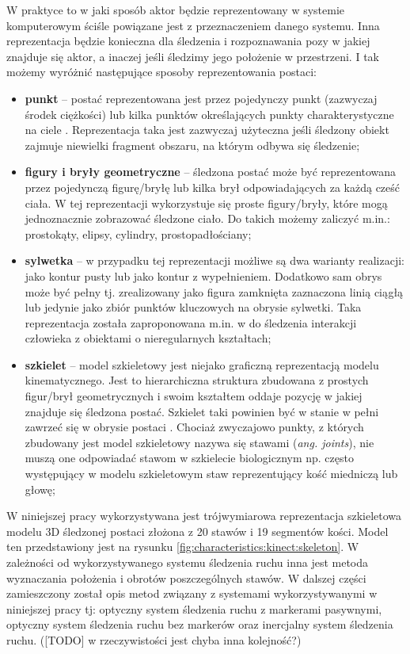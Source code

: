 	W praktyce to w jaki sposób aktor będzie reprezentowany w systemie komputerowym ściśle powiązane jest z przeznaczeniem danego systemu. Inna reprezentacja będzie konieczna dla śledzenia i rozpoznawania pozy w jakiej znajduje się aktor, a inaczej jeśli śledzimy jego położenie w przestrzeni. I tak możemy wyróżnić następujące sposoby reprezentowania postaci:
	\begin{itemize}
		\item \textbf{punkt} -- postać reprezentowana jest przez pojedynczy punkt (zazwyczaj środek ciężkości) \cite{Veenman2001} lub kilka punktów określających punkty charakterystyczne na ciele \cite{Serby2004}. Reprezentacja taka jest zazwyczaj użyteczna jeśli śledzony obiekt zajmuje niewielki fragment obszaru, na którym odbywa się śledzenie;
		\item \textbf{figury i bryły geometryczne} -- śledzona postać może być reprezentowana przez pojedynczą figurę/bryłę \cite{Comaniciu2003} lub kilka brył odpowiadających za każdą cześć ciała. W tej reprezentacji wykorzystuje się proste figury/bryły, które mogą jednoznacznie zobrazować śledzone ciało. Do takich możemy zaliczyć m.in.: prostokąty, elipsy, cylindry, prostopadłościany;
		\item \textbf{sylwetka} -- w przypadku tej reprezentacji możliwe są dwa warianty realizacji: jako kontur pusty lub jako kontur z wypełnieniem. Dodatkowo sam obrys może być pełny tj. zrealizowany jako figura zamknięta zaznaczona linią ciągłą lub jedynie jako zbiór punktów kluczowych na obrysie sylwetki. Taka reprezentacja została zaproponowana m.in. w \cite{Yilmaz2004} do śledzenia interakcji człowieka z obiektami o nieregularnych kształtach;
		\item \textbf{szkielet} -- model szkieletowy jest niejako graficzną reprezentacją modelu kinematycznego. Jest to hierarchiczna struktura zbudowana z prostych figur/brył geometrycznych i swoim kształtem oddaje pozycję w jakiej znajduje się śledzona postać. Szkielet taki powinien być w stanie w pełni zawrzeć się w obrysie postaci \cite{Ali2001}. Chociaż zwyczajowo punkty, z których zbudowany jest model szkieletowy nazywa się stawami (\emph{ang. joints}), nie muszą one odpowiadać stawom w szkielecie biologicznym np. często występujący w modelu szkieletowym staw reprezentujący kość miedniczą lub głowę;
	\end{itemize}
	\vspace{2cm}
	W niniejszej pracy wykorzystywana jest trójwymiarowa reprezentacja szkieletowa modelu 3D śledzonej postaci złożona z 20 stawów i 19 segmentów kości. Model ten przedstawiony jest na rysunku \ref{fig:characteristics:kinect:skeleton}. W zależności od wykorzystywanego systemu śledzenia ruchu inna jest metoda wyznaczania położenia i obrotów poszczególnych stawów. W dalszej części zamieszczony został opis metod związany z systemami wykorzystywanymi w niniejszej pracy tj: optyczny system śledzenia ruchu z markerami pasywnymi, optyczny system śledzenia ruchu bez markerów oraz inercjalny system śledzenia ruchu. ([TODO] w rzeczywistości jest chyba inna kolejność?)
	
